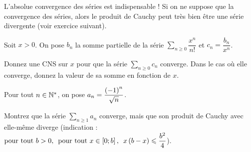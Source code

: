 \begin{rem}
L'absolue convergence des séries est indispensable ! Si on ne suppose que la convergence des séries, alors le produit de Cauchy peut très bien être une série divergente (voir exercice suivant).
\end{rem}

\begin{exo}
Soit \(x>0\). On pose \(b_n\) la somme partielle de la série \(\sum_{n\geq0}\dfrac{x^n}{n!}\) et \(c_n=\dfrac{b_n}{x^n}\).

Donnez une CNS sur \(x\) pour que la série \(\sum_{n\geq0}c_n\) converge. Dans le cas où elle converge, donnez la valeur de sa somme en fonction de \(x\).
\end{exo}

\begin{exo}
Pour tout \(n\in\mathbb{N}^*\), on pose \(a_n=\dfrac{\left(-1\right)^n}{\sqrt{n}}\).

Montrez que la série \(\sum_{n\geq1}a_n\) converge, mais que son produit de Cauchy avec elle-même diverge (indication : \(\quantifs{\tpt b>0;\tpt x\in\intervii{0}{b}}x\paren{b-x}\leq\dfrac{b^2}{4}\)).
\end{exo}
